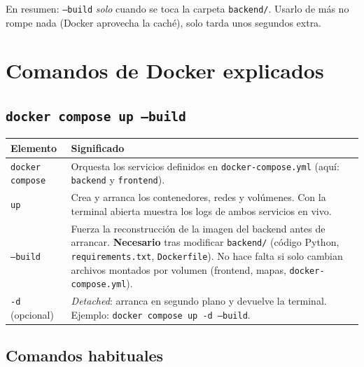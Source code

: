 \documentclass[11pt,a4paper]{article}
\begin{document}
En resumen: \texttt{--build} \emph{solo} cuando se toca la carpeta
\texttt{backend/}. Usarlo de más no rompe nada (Docker aprovecha la caché),
solo tarda unos segundos extra.

\section{Comandos de Docker explicados}

\subsection{\texttt{docker compose up --build}}

\begin{longtable}{@{}p{4.2cm}p{10.5cm}@{}}
\toprule
\textbf{Elemento} & \textbf{Significado} \\
\midrule
\texttt{docker compose} & Orquesta los servicios definidos en
  \texttt{docker-compose.yml} (aquí: \texttt{backend} y \texttt{frontend}). \\
\texttt{up} & Crea y arranca los contenedores, redes y volúmenes. Con la
  terminal abierta muestra los logs de ambos servicios en vivo. \\
\texttt{--build} & Fuerza la reconstrucción de la imagen del backend antes de
  arrancar. \textbf{Necesario} tras modificar \texttt{backend/} (código Python,
  \texttt{requirements.txt}, \texttt{Dockerfile}). No hace falta si solo cambian
  archivos montados por volumen (frontend, mapas, \texttt{docker-compose.yml}). \\
\texttt{-d} (opcional) & \emph{Detached}: arranca en segundo plano y devuelve la
  terminal. Ejemplo: \texttt{docker compose up -d --build}. \\
\bottomrule
\end{longtable}

\subsection{Comandos habituales}
\end{document}

